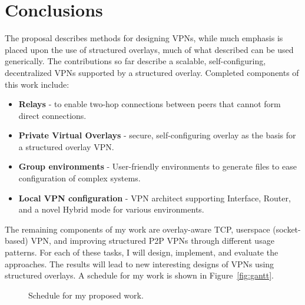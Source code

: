 \chapter{Conclusions}
The proposal describes methods for designing VPNs, while much emphasis is
placed upon the use of structured overlays, much of what described can be used
generically.  The contributions so far describe a scalable, self-configuring,
decentralized VPNs supported by a structured overlay.  Completed components of
this work include:
\begin{itemize}
\item \textbf{Relays} - to enable two-hop connections between peers that cannot
form direct connections.
\item \textbf{Private Virtual Overlays} - secure, self-configuring overlay as
the basis for a structured overlay VPN.
\item \textbf{Group environments} - User-friendly environments to generate
files to ease configuration of complex systems.
\item \textbf{Local VPN configuration} - VPN architect supporting Interface,
Router, and a novel Hybrid mode for various environments.
\end{itemize}

The remaining components of my work are overlay-aware TCP, userspace
(socket-based) VPN, and improving structured P2P VPNs through different usage
patterns.  For each of these tasks, I will design, implement, and evaluate the
approaches.  The results will lead to new interesting designs of VPNs using
structured overlays.  A schedule for my work is shown in Figure~\ref{fig:gantt}.

\begin{figure}[ht]
\centering
{}
\caption{Schedule for my proposed work.}
\label{fig:latency}
\end{figure}
